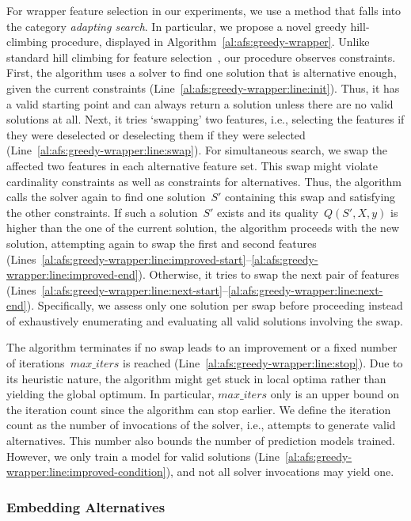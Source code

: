 \documentclass{article}
\theoremstyle{definition}
\begin{document}
For wrapper feature selection in our experiments, we use a method that falls into the category \emph{adapting search}.
In particular, we propose a novel greedy hill-climbing procedure, displayed in Algorithm~\ref{al:afs:greedy-wrapper}.
Unlike standard hill climbing for feature selection~\cite{kohavi1997wrappers}, our procedure observes constraints.
First, the algorithm uses a solver to find one solution that is alternative enough, given the current constraints (Line~\ref{al:afs:greedy-wrapper:line:init}).
Thus, it has a valid starting point and can always return a solution unless there are no valid solutions at all.
Next, it tries `swapping' two features, i.e., selecting the features if they were deselected or deselecting them if they were selected (Line~\ref{al:afs:greedy-wrapper:line:swap}).
For simultaneous search, we swap the affected two features in each alternative feature set.
This swap might violate cardinality constraints as well as constraints for alternatives.
Thus, the algorithm calls the solver again to find one solution~$S'$ containing this swap and satisfying the other constraints.
If such a solution~$S'$ exists and its quality~$Q(S',X,y)$ is higher than the one of the current solution, the algorithm proceeds with the new solution, attempting again to swap the first and second features (Lines~\ref{al:afs:greedy-wrapper:line:improved-start}--\ref{al:afs:greedy-wrapper:line:improved-end}).
Otherwise, it tries to swap the next pair of features (Lines~\ref{al:afs:greedy-wrapper:line:next-start}--\ref{al:afs:greedy-wrapper:line:next-end}).
Specifically, we assess only one solution per swap before proceeding instead of exhaustively enumerating and evaluating all valid solutions involving the swap.

The algorithm terminates if no swap leads to an improvement or a fixed number of iterations~$\mathit{max\_iters}$ is reached (Line~\ref{al:afs:greedy-wrapper:line:stop}).
Due to its heuristic nature, the algorithm might get stuck in local optima rather than yielding the global optimum.
In particular, $\mathit{max\_iters}$ only is an upper bound on the iteration count since the algorithm can stop earlier.
We define the iteration count as the number of invocations of the solver, i.e., attempts to generate valid alternatives.
This number also bounds the number of prediction models trained.
However, we only train a model for valid solutions (Line~\ref{al:afs:greedy-wrapper:line:improved-condition}), and not all solver invocations may yield one.

\subsubsection{Embedding Alternatives}
\label{sec:afs:approach:objectives:embedding}
\end{document}
